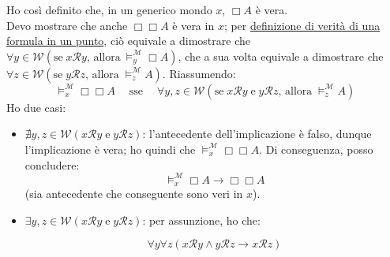 \documentclass[a4paper,12pt]{article}
\begin{document}
\begin{dimo}
\begin{enumerate}
		      Ho così definito che, in un generico mondo $x$, $\Box A$ è vera. \\
		      Devo mostrare che anche $\Box \Box A$ è vera in $x$; per \hyperlink{defverp}{definizione di verità di una formula in un punto}, ciò equivale a dimostrare che $\forall y \in \mathcal{W} (\text{se} \; x\mathcal{R}y  \text{, allora} \: \vDash_y^{\mathcal{M}} \Box A)$, che a sua volta equivale a dimostrare che $\forall z \in \mathcal{W} (\text{se} \; y\mathcal{R}z  \text{, allora} \; \vDash_z^{\mathcal{M}} A)$. Riassumendo:
		      $$\vDash_x^{\mathcal{M}} \Box \Box A \quad \; \text{sse} \; \quad \forall y, z \in \mathcal{W} (\text{se} \; x\mathcal{R}y \; \text{e} \; y\mathcal{R}z  \text{, allora} \; \vDash_z^{\mathcal{M}} A)$$
		      Ho due casi:
		      \begin{itemize}
			      \item $\nexists y, z \in \mathcal{W}(x\mathcal{R}y \; \text{e} \; y\mathcal{R}z)$: l'antecedente dell'implicazione è falso, dunque l'implicazione è vera; ho quindi che $\vDash_x^{\mathcal{M}} \Box \Box A$. Di conseguenza, posso concludere:
			            $$\vDash_x^{\mathcal{M}} \Box A \to \Box \Box A$$
			            (sia antecedente che conseguente sono veri in $x$).
			      \item $\exists y, z \in \mathcal{W}(x\mathcal{R}y \; \text{e} \; y\mathcal{R}z)$:
			            per assunzione, ho che:
			            \vspace{8pt}

			            \begin{minipage}{0.48\textwidth}
				            $$\forall y \forall z (x\mathcal{R}y \land y\mathcal{R}z \to x\mathcal{R}z)$$
			            \end{minipage}
			            \begin{minipage}{0.48\textwidth}
				            \begin{center}
				            \end{center}
			            \end{minipage}
			            \vspace{0pt}


\end{itemize}
\end{enumerate}
\end{dimo}
\end{document}
